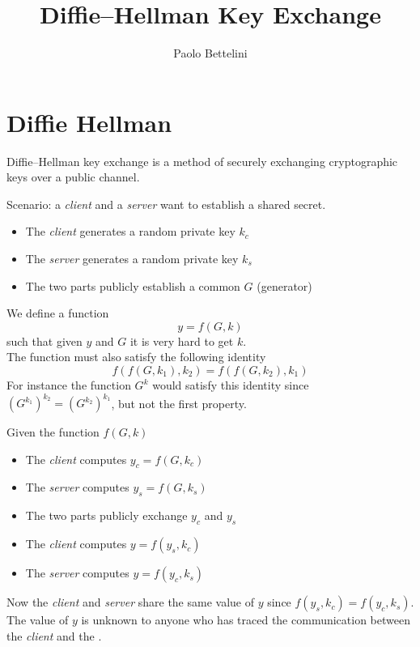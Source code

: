\documentclass{article}
\title{Diffie–Hellman Key Exchange}
\author{Paolo Bettelini}
\date{}
\begin{document}
\maketitle
\tableofcontents
\pagebreak

\section{Diffie Hellman}

Diffie–Hellman key exchange is a method of securely exchanging cryptographic keys over a public channel.

Scenario: a \textit{client} and a \textit{server} want to establish a shared secret.
\begin{itemize}
	\item The \textit{client} generates a random private key \(k_c\)
	\item The \textit{server} generates a random private key \(k_s\)
	\item The two parts publicly establish a common \(G\) (generator)
\end{itemize}

We define a function
\[
	y=f(G,k)
\]
such that given \(y\) and \(G\) it is very hard to get \(k\).\\
The function must also satisfy the following identity
\[
	f(f(G, k_1), k_2)=f(f(G, k_2), k_1)
\]
For instance the function \(G^k\) would satisfy this identity since \({\left(G^{k_1}\right)}^{k_2}={\left(G^{k_2}\right)}^{k_1}\), but not the first property.

Given the function \(f(G,k)\)
\begin{itemize}
	\item The \textit{client} computes \(y_c=f(G,k_c)\)
	\item The \textit{server} computes \(y_s=f(G,k_s)\)
	\item The two parts publicly exchange \(y_c\) and \(y_s\)
	\item The \textit{client} computes \(y=f(y_s,k_c)\)
	\item The \textit{server} computes \(y=f(y_c,k_s)\)
\end{itemize}
Now the \textit{client} and \textit{server} share the same value of \(y\) since \(f(y_s,k_c)=f(y_c,k_s)\).\\
The value of \(y\) is unknown to anyone who has traced the communication between the \textit{client} and the .
\end{document}
